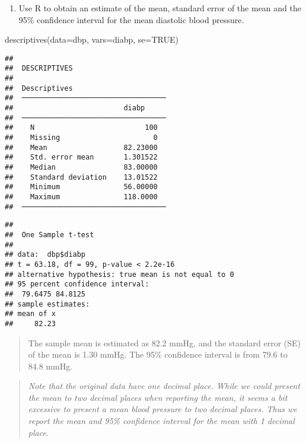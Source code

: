 \documentclass[
]{memoir}
\newenvironment{Shaded}{\begin{snugshade}}{\end{snugshade}}
\newcommand{\AttributeTok}[1]{\textcolor[rgb]{0.77,0.63,0.00}{#1}}
\newcommand{\ConstantTok}[1]{\textcolor[rgb]{0.00,0.00,0.00}{#1}}
\newcommand{\FunctionTok}[1]{\textcolor[rgb]{0.00,0.00,0.00}{#1}}
\newcommand{\NormalTok}[1]{#1}
\newcommand{\SpecialCharTok}[1]{\textcolor[rgb]{0.00,0.00,0.00}{#1}}
\providecommand{\tightlist}{%
  \setlength{\itemsep}{0pt}\setlength{\parskip}{0pt}}
\begin{document}
\begin{enumerate}
\def\labelenumi{\alph{enumi})}
\setcounter{enumi}{1}
\tightlist
\item
  Use R to obtain an estimate of the mean, standard error of the mean and the 95\% confidence interval for the mean diastolic blood pressure.
\end{enumerate}

\begin{Shaded}
\begin{Highlighting}[]
\FunctionTok{descriptives}\NormalTok{(}\AttributeTok{data=}\NormalTok{dbp, }\AttributeTok{vars=}\NormalTok{diabp, }\AttributeTok{se=}\ConstantTok{TRUE}\NormalTok{)}
\end{Highlighting}
\end{Shaded}

\begin{verbatim}
## 
##  DESCRIPTIVES
## 
##  Descriptives                       
##  ────────────────────────────────── 
##                          diabp      
##  ────────────────────────────────── 
##    N                          100   
##    Missing                      0   
##    Mean                  82.23000   
##    Std. error mean       1.301522   
##    Median                83.00000   
##    Standard deviation    13.01522   
##    Minimum               56.00000   
##    Maximum               118.0000   
##  ──────────────────────────────────
\end{verbatim}

\begin{Shaded}
\end{Shaded}

\begin{verbatim}
## 
##  One Sample t-test
## 
## data:  dbp$diabp
## t = 63.18, df = 99, p-value < 2.2e-16
## alternative hypothesis: true mean is not equal to 0
## 95 percent confidence interval:
##  79.6475 84.8125
## sample estimates:
## mean of x 
##     82.23
\end{verbatim}

\begin{quote}
The sample mean is estimated as 82.2 mmHg, and the standard error (SE) of the mean is 1.30 mmHg. The 95\% confidence interval is from 79.6 to 84.8 mmHg.
\end{quote}

\begin{quote}
\emph{Note that the original data have one decimal place. While we could present the mean to two decimal places when reporting the mean, it seems a bit excessive to present a mean blood pressure to two decimal places. Thus we report the mean and 95\% confidence interval for the mean with 1 decimal place.}
\end{quote}
\end{document}
